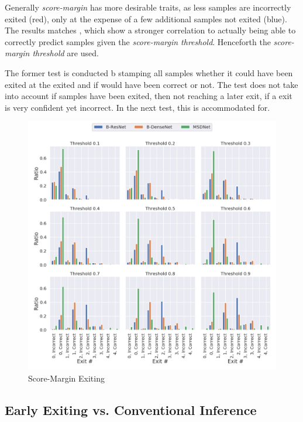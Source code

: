 Generally \emph{score-margin} has more desirable traits, as less samples are incorrectly exited (red), only at the expense of a few additional samples not exited ({\color{sns-blue}blue}). The results matches \cite{park_big/little_2015}, which show a stronger correlation to actually being able to correctly predict samples given the \emph{score-margin threshold}. Henceforth the \emph{score-margin threshold} are used.

The former test is conducted b stamping all samples whether it could have been exited at the exited and if would have been correct or not. The test does not take into account if samples have been exited, then not reaching a later exit, if a exit is very confident yet incorrect. In the next test, this is accommodated for.

\begin{figure}
	\centering
	\includegraphics[width=\linewidth]{figures/threshold_plots/inference_threshold_test}
	\caption{Score-Margin Exiting}
	\label{fig:inferencethresholdtest}
\end{figure}



\subsection{Early Exiting vs. Conventional Inference}

